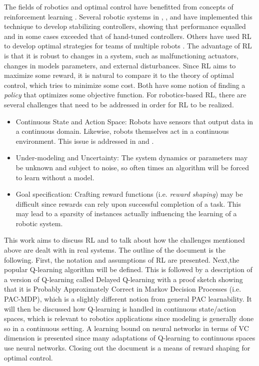 \documentclass{article} %
\begin{document}
The fields of robotics and optimal control have benefitted from concepts of reinforcement learning \cite{kaelbling_reinforcement_1996} \cite{kober_reinforcement_2013}. Several robotic systems in  \cite{bhasin_reinforcement_2011}, \cite{hester_rtmba:_2012}, and  \cite{kim_autonomous_2003} have implemented this technique to develop stabilizing controllers, showing that performance equalled and in some cases exceeded that of hand-tuned controllers. Others have used RL to develop optimal strategies for teams of multiple robots \cite{yang_multiagent_2004}.  The advantage of RL is that it is robust to changes in a system, such as malfunctioning actuators, changes in models parameters, and external disturbances. Since RL aims to maximize some reward, it is natural to compare it to the theory of optimal control, which tries to minimize some cost.  Both have some notion of finding a \textit{policy} that optimizes some objective function. For robotics-based RL, there are several challenges that need to be addressed in order for RL to be realized.
\begin{itemize}
\item Continuous State and Action Space: Robots have sensors that output data in a continuous domain.  Likewise, robots themselves act in a continuous environment. This issue is addressed in \cite{gaskett_thesis} and \cite{q_learning_navigation}.
\item Under-modeling and Uncertainty: The system dynamics or parameters may be unknown and subject to noise, so often times an algorithm will be forced to learn without a model.
\item Goal specification: Crafting reward functions (i.e. \textit{reward shaping}) may be difficult since rewards can rely upon successful completion of a task. This may lead to a sparsity of instances actually influencing the learning of a robotic system.
\end{itemize}

This work aims to discuss RL and to talk about how the challenges mentioned above are dealt with in real systems. The outline of the document is the following. First, the notation and assumptions of RL are presented. Next,the popular Q-learning algorithm will be defined.  This is followed by a description of a version of Q-learning called Delayed Q-learning with a proof sketch showing that it is Probably Approximately Correct in Markov Decision Processes (i.e. PAC-MDP), which is a slightly different notion from general PAC learnability. It will then be discussed how Q-learning is handled in continuous state/action spaces, which is relevant to robotics applications since modeling is generally done so in a continuous setting. A learning bound on neural networks in terms of VC dimension is presented since many adaptations of Q-learning to continuous spaces use neural networks. Closing out the document is a means of reward shaping for optimal control.
\end{document}
